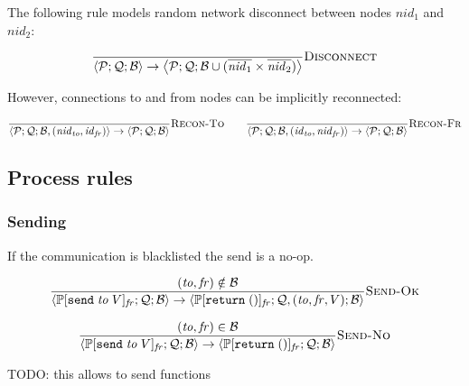 \documentclass{article}
\newcommand{\sReturn}{\mathtt{return}}
\newcommand{\sSend}{\mathtt{send}}
\newcommand{\sNid}{\ensuremath{\mathit{nid}}}
\newcommand{\sId}{\ensuremath{\mathit{id}}}
\newcommand{\sSystem}[3]{\left\langle #1 ; #2 ; #3 \right\rangle}
\newcommand{\sQueue}{\mathcal{Q}}
\newcommand{\sProcesses}{\mathcal{P}}
\newcommand{\sBlacklist}{\mathcal{B}}
\newcommand{\sCtxt}[1]{\mathbb{#1}}
\begin{document}
The following rule models random network disconnect between nodes $\sNid_1$ and
$\sNid_2$:

\begin{equation*}
\frac{
}{
  \sSystem{\sProcesses}{\sQueue}{\sBlacklist}
\rightarrow
  \sSystem{\sProcesses}{\sQueue}{\sBlacklist \cup (\overline{\sNid_1} \times \overline{\sNid_2})}
} \textsc{Disconnect}
\end{equation*}

However, connections to and from nodes can be implicitly reconnected:

\begin{equation*}
\frac{
}{
  \sSystem{\sProcesses}{\sQueue}{\sBlacklist, (\sNid_\mathit{to}, \sId_\mathit{fr})}
\rightarrow
  \sSystem{\sProcesses}{\sQueue}{\sBlacklist}
} \textsc{Recon-To}
\qquad
\frac{
}{
  \sSystem{\sProcesses}{\sQueue}{\sBlacklist, (\sId_\mathit{to}, \sNid_\mathit{fr})}
\rightarrow
  \sSystem{\sProcesses}{\sQueue}{\sBlacklist}
} \textsc{Recon-Fr}
\end{equation*}

\subsection{Process rules}

\subsubsection{Sending}

If the communication is blacklisted the send is a no-op.

\begin{equation*}
\frac{
(\mathit{to}, \mathit{fr}) \notin \sBlacklist
}{
  \sSystem{\sCtxt{P}[ \sSend \; \mathit{to} \; V ]_\mathit{fr}}
          {\sQueue}
          {\sBlacklist}
\rightarrow 
  \sSystem{\sCtxt{P}[ \sReturn \; () ]_\mathit{fr}}
          {\sQueue, (\mathit{to}, \mathit{fr}, V)}
          {\sBlacklist}
} \textsc{Send-Ok}
\end{equation*}

\begin{equation*}
\frac{
(\mathit{to}, \mathit{fr}) \in \sBlacklist
}{
  \sSystem{\sCtxt{P}[ \sSend \; \mathit{to} \; V ]_\mathit{fr}}
          {\sQueue}
          {\sBlacklist}
\rightarrow 
  \sSystem{\sCtxt{P}[ \sReturn \; () ]_\mathit{fr}}
          {\sQueue}
          {\sBlacklist}
} \textsc{Send-No}
\end{equation*}

TODO: this allows to send functions
\end{document}
